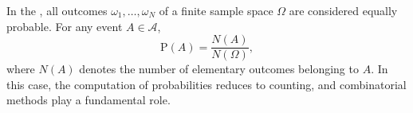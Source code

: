In the , all outcomes $\omega_1, \ldots, \omega_N$ of a finite sample space $\Omega$ are considered equally probable. For any event $A \in \mathcal{A}$,
$$\text{P}(A) = \frac{N(A)}{N(\Omega)},$$
where $N(A)$ denotes the number of elementary outcomes belonging to $A$. In this case, the computation of probabilities reduces to counting, and combinatorial methods play a fundamental role.
